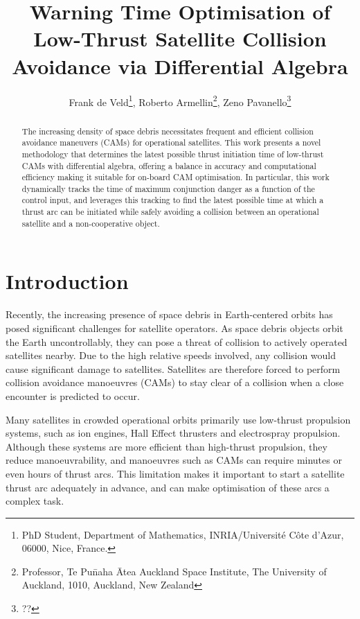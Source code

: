 \documentclass[letterpaper, preprint, paper,11pt]{AAS}	%
\begin{document}
\title{Warning Time Optimisation of Low-Thrust Satellite Collision Avoidance via Differential Algebra }

\author{Frank de Veld\thanks{PhD Student, Department of Mathematics, INRIA/Universit\'e C\^ote d'Azur, 06000, Nice, France.},  
Roberto Armellin\thanks{Professor, Te Pu\=naha \=Atea Auckland Space Institute, The University of Auckland, 1010, Auckland, New Zealand}, Zeno Pavanello\thanks{??} }



\maketitle{} 		


\begin{abstract}
The increasing density of space debris necessitates frequent and efficient collision avoidance maneuvers (CAMs) for operational satellites. This work presents a novel methodology that determines the latest possible thrust initiation time of low-thrust CAMs with differential algebra, offering a balance in accuracy and computational efficiency making it suitable for on-board CAM optimisation. In particular, this work dynamically tracks the time of maximum conjunction danger as a function of the control input, and leverages this tracking to find the latest possible time at which a thrust arc can be initiated while safely avoiding a collision between an operational satellite and a non-cooperative object.
\end{abstract}








\section{Introduction}

Recently, the increasing presence of space debris in Earth-centered orbits has posed significant challenges for satellite operators. As space debris objects orbit the Earth uncontrollably, they can pose a threat of collision to actively operated satellites nearby. Due to the high relative speeds involved, any collision would cause significant damage to satellites. Satellites are therefore forced to perform collision avoidance manoeuvres (CAMs) to stay clear of a collision when a close encounter is predicted to occur.

Many satellites in crowded operational orbits primarily use low-thrust propulsion systems, such as ion engines, Hall Effect thrusters and electrospray propulsion. Although these systems are more efficient than high-thrust propulsion, they reduce manoeuvrability, and manoeuvres such as CAMs can require minutes or even hours of thrust arcs. This limitation makes it important to start a satellite thrust arc adequately in advance, and can make optimisation of these arcs a complex task.
\end{document}
